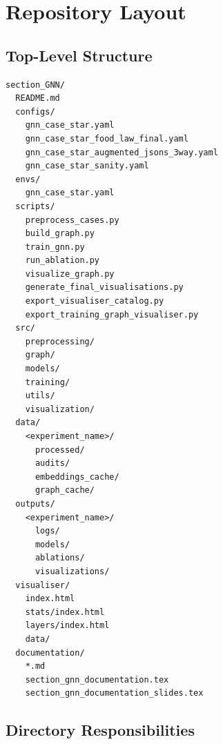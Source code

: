 \documentclass[11pt,a4paper]{article}
\begin{document}
\section{Repository Layout}

\subsection{Top-Level Structure}

\begin{lstlisting}
section_GNN/
  README.md
  configs/
    gnn_case_star.yaml
    gnn_case_star_food_law_final.yaml
    gnn_case_star_augmented_jsons_3way.yaml
    gnn_case_star_sanity.yaml
  envs/
    gnn_case_star.yaml
  scripts/
    preprocess_cases.py
    build_graph.py
    train_gnn.py
    run_ablation.py
    visualize_graph.py
    generate_final_visualisations.py
    export_visualiser_catalog.py
    export_training_graph_visualiser.py
  src/
    preprocessing/
    graph/
    models/
    training/
    utils/
    visualization/
  data/
    <experiment_name>/
      processed/
      audits/
      embeddings_cache/
      graph_cache/
  outputs/
    <experiment_name>/
      logs/
      models/
      ablations/
      visualizations/
  visualiser/
    index.html
    stats/index.html
    layers/index.html
    data/
  documentation/
    *.md
    section_gnn_documentation.tex
    section_gnn_documentation_slides.tex
\end{lstlisting}

\subsection{Directory Responsibilities}
\end{document}
